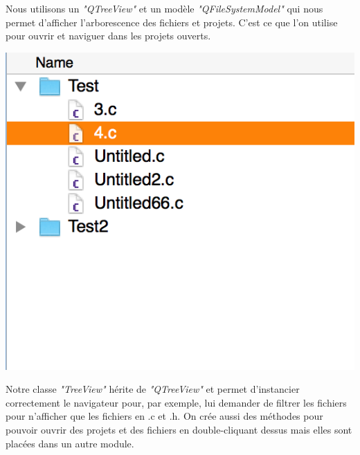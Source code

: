 \documentclass[a4paper,12pt]{article}
\begin{document}
				Nous utilisons un \textit{"QTreeView"} et un modèle \textit{"QFileSystemModel"} qui nous permet d'afficher l'arborescence des fichiers et projets. C'est ce que l'on utilise pour ouvrir et naviguer dans les projets ouverts.\\
			\begin{center}
				\includegraphics[scale=0.6]{images/QTreeView}
				\vspace{0.6cm}
			\end{center}
			Notre classe \textit{"TreeView"} hérite de \textit{"QTreeView"} et permet d'instancier correctement le navigateur pour, par exemple, lui demander de filtrer les fichiers pour n'afficher que les fichiers en .c et .h. On crée aussi des méthodes pour pouvoir ouvrir des projets et des fichiers en double-cliquant dessus mais elles sont placées dans un autre module.\\
			
\end{document}
